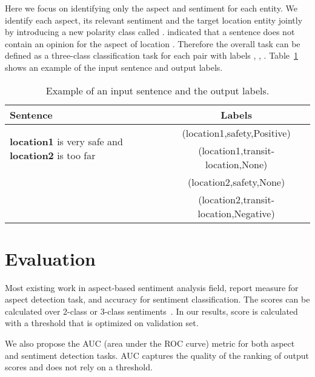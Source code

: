 \documentclass[11pt]{article}
\begin{document}
        Here we focus on identifying only the aspect and sentiment for each entity. We identify each aspect, its relevant sentiment and the target location entity jointly by introducing a new polarity class called .  indicated that a sentence does not contain an opinion for the aspect  of location . Therefore the overall task can be defined as a three-class classification task for each  pair with labels , , . Table~\ref{tab:example_task} shows an example of the input sentence and output labels. 
        \begin{table}[ht]
            \begin{center}
            \begin{tabular}{| l | c |}
            \hline
                \textbf{Sentence}                                                                    & \textbf{Labels}    \\
                \hline
                \multirow{2}{*}{\textbf{location1} is very safe and \textbf{location2} is too far}      & (location1,safety,Positive) \\
                                                                                                        & (location1,transit-location,None)\\
                                                                                                        & (location2,safety,None)\\
                                                                                                        & (location2,transit-location,Negative)\\
                \hline
            \end{tabular}
            \end{center}
            \caption{Example of an input sentence and the output labels.}
            \label{tab:example_task}
        \end{table} 
\section{Evaluation}
        Most existing work in aspect-based sentiment analysis field, report  measure for aspect detection task, and accuracy for sentiment classification. The scores can be calculated over 2-class or 3-class sentiments~\cite{pontiki2015semeval}. In our results,  score is calculated with a threshold that is optimized on validation set. 
        
        We also propose the AUC (area under the ROC curve) metric for both aspect and sentiment detection tasks. AUC captures the quality of the ranking of output scores and does not rely on a threshold. 
    
\end{document}
